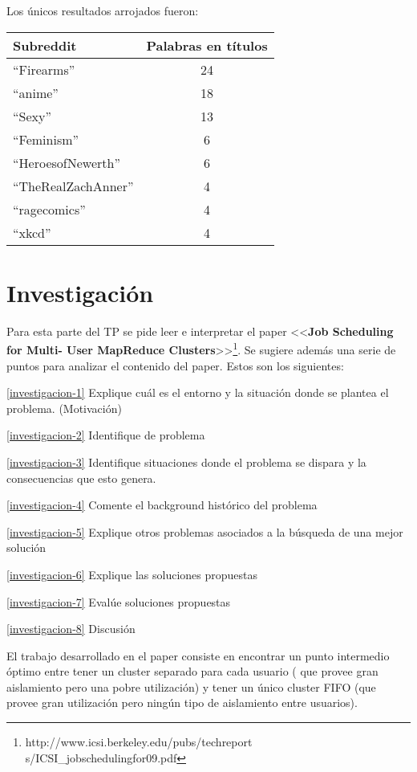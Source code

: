 \documentclass[11pt, a4paper, twoside]{article}
\begin{document}
Los únicos resultados arrojados fueron:

\begin{center}
  \begin{tabular}{l|c}
    \textbf{Subreddit} & \textbf{Palabras en títulos} \\ \hline
    ``Firearms'' & 24 \\
    ``anime'' & 18 \\
    ``Sexy'' & 13 \\
    ``Feminism'' & 6 \\
    ``HeroesofNewerth'' & 6 \\
    ``TheRealZachAnner'' & 4 \\
    ``ragecomics'' & 4 \\
    ``xkcd'' & 4 \\
  \end{tabular}
\end{center}

\clearpage
{}
\section{Investigación}
Para esta parte del TP se pide leer e interpretar el paper <<\textbf{Job
Scheduling for Multi- User MapReduce
Clusters}>>\footnote{http://www.icsi.berkeley.edu/pubs/techreport
s/ICSI\_jobschedulingfor09.pdf}. Se sugiere además una serie de puntos
para analizar el contenido del paper. Estos son los siguientes:

\vspace{3em}
\ref{investigacion-1} Explique cuál es el entorno y la situación donde se plantea el problema. (Motivación)

\ref{investigacion-2} Identifique de problema

\ref{investigacion-3} Identifique situaciones donde el problema se dispara y la consecuencias que esto genera.

\ref{investigacion-4} Comente el background histórico del problema

\ref{investigacion-5} Explique otros problemas asociados a la búsqueda de una mejor solución

\ref{investigacion-6} Explique las soluciones propuestas

\ref{investigacion-7} Evalúe soluciones propuestas

\ref{investigacion-8} Discusión

El trabajo desarrollado en el paper consiste en encontrar un punto
intermedio óptimo entre tener un cluster separado para cada usuario (
que provee gran aislamiento pero una pobre utilización) y tener un único
cluster FIFO (que provee gran utilización pero ningún tipo de 
aislamiento entre usuarios). 
\end{document}
